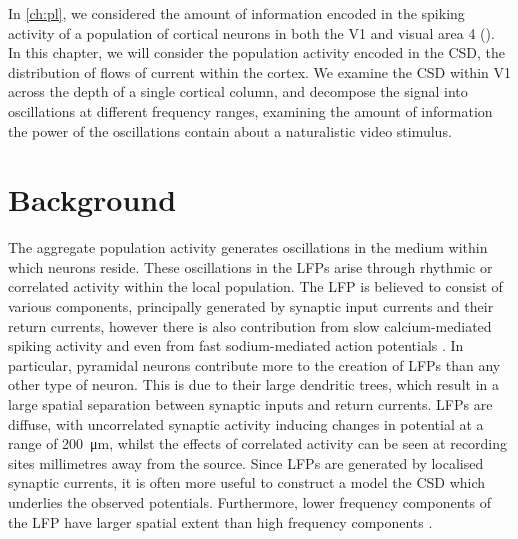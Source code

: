 
In \autoref{ch:pl}, we considered the amount of information encoded in the spiking activity of a population of cortical neurons in both the \acf{V1} and visual area 4 ().
In this chapter, we will consider the population activity encoded in the \ac{CSD}, the distribution of flows of current within the cortex.
We examine the \ac{CSD} within \ac{V1} across the depth of a single cortical column, and decompose the signal into oscillations at different frequency ranges, examining the amount of information the power of the oscillations contain about a naturalistic video stimulus.


\section{Background}




The aggregate population activity generates oscillations in the medium within which neurons reside.
These oscillations in the \acp{LFP} arise through rhythmic or correlated activity within the local population.
The \ac{LFP} is believed to consist of various components, principally generated by synaptic input currents and their return currents, however there is also contribution from slow calcium-mediated spiking activity and even from fast sodium-mediated action potentials \citep{Einevoll2013}.
In particular, pyramidal neurons contribute more to the creation of \acp{LFP} than any other type of neuron.
This is due to their large dendritic trees, which result in a large spatial separation between synaptic inputs and return currents.
\acp{LFP} are diffuse, with uncorrelated synaptic activity inducing changes in potential at a range of \SI{200}{\micro\metre}, whilst the effects of correlated activity can be seen at recording sites millimetres away from the source.
Since \acp{LFP} are generated by localised synaptic currents, it is often more useful to construct a model the \acf{CSD} which underlies the observed potentials.
Furthermore, lower frequency components of the \ac{LFP} have larger spatial extent than high frequency components \citep{Leski2013}.

